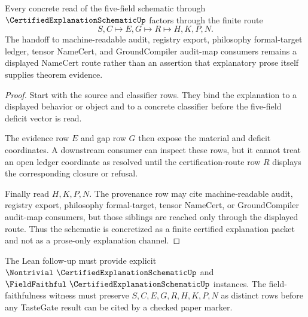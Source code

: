 \begin{theorem}
\label{thm:certified-explanation-schematic-vision-handoff}
Every concrete read of the five-field schematic through $\CertifiedExplanationSchematicUp$ factors through the finite route
$$
S,C \longmapsto E,G \longmapsto R \longmapsto H,K,P,N .
$$
The handoff to machine-readable audit, registry export, philosophy formal-target ledger, tensor NameCert, and GroundCompiler audit-map consumers remains a displayed NameCert route rather than an assertion that explanatory prose itself supplies theorem evidence.
\end{theorem}
\begin{proof}
Start with the source and classifier rows. They bind the explanation to a displayed behavior or object and to a concrete classifier before the five-field deficit vector is read.

The evidence row $E$ and gap row $G$ then expose the material and deficit coordinates. A downstream consumer can inspect these rows, but it cannot treat an open ledger coordinate as resolved until the certification-route row $R$ displays the corresponding closure or refusal.

Finally read $H,K,P,N$. The provenance row may cite machine-readable audit, registry export, philosophy formal-target, tensor NameCert, or GroundCompiler audit-map consumers, but those siblings are reached only through the displayed route. Thus the schematic is concretized as a finite certified explanation packet and not as a prose-only explanation channel.
\end{proof}

The Lean follow-up must provide explicit $\Nontrivial\ \CertifiedExplanationSchematicUp$ and $\FieldFaithful\ \CertifiedExplanationSchematicUp$ instances. The field-faithfulness witness must preserve $S,C,E,G,R,H,K,P,N$ as distinct rows before any TasteGate result can be cited by a checked paper marker.


\begin{closurestatus}{\CertifiedExplanationSchematicUp}
  \theoryclosure{\seedClosure}
  \formalstatus{\unformalizedV}
\end{closurestatus}
